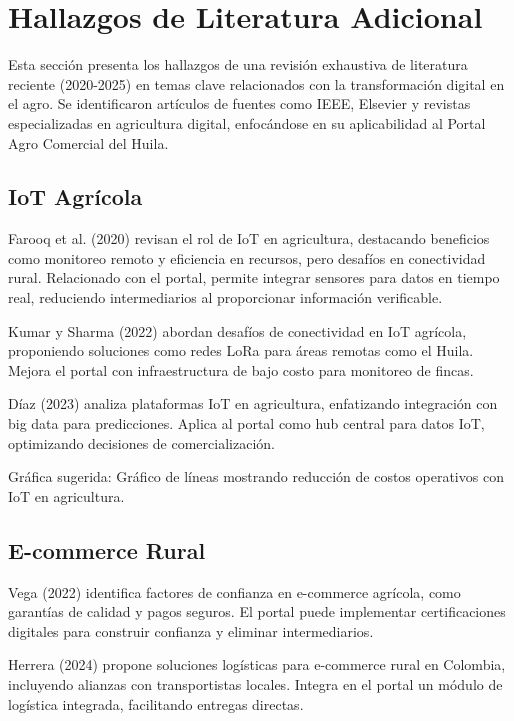 \section{Hallazgos de Literatura Adicional}

Esta sección presenta los hallazgos de una revisión exhaustiva de literatura reciente (2020-2025) en temas clave relacionados con la transformación digital en el agro. Se identificaron artículos de fuentes como IEEE, Elsevier y revistas especializadas en agricultura digital, enfocándose en su aplicabilidad al Portal Agro Comercial del Huila.

\subsection{IoT Agrícola}

Farooq et al. (2020) revisan el rol de IoT en agricultura, destacando beneficios como monitoreo remoto y eficiencia en recursos, pero desafíos en conectividad rural. Relacionado con el portal, permite integrar sensores para datos en tiempo real, reduciendo intermediarios al proporcionar información verificable.

Kumar y Sharma (2022) abordan desafíos de conectividad en IoT agrícola, proponiendo soluciones como redes LoRa para áreas remotas como el Huila. Mejora el portal con infraestructura de bajo costo para monitoreo de fincas.

Díaz (2023) analiza plataformas IoT en agricultura, enfatizando integración con big data para predicciones. Aplica al portal como hub central para datos IoT, optimizando decisiones de comercialización.

Gráfica sugerida: Gráfico de líneas mostrando reducción de costos operativos con IoT en agricultura.

\subsection{E-commerce Rural}

Vega (2022) identifica factores de confianza en e-commerce agrícola, como garantías de calidad y pagos seguros. El portal puede implementar certificaciones digitales para construir confianza y eliminar intermediarios.

Herrera (2024) propone soluciones logísticas para e-commerce rural en Colombia, incluyendo alianzas con transportistas locales. Integra en el portal un módulo de logística integrada, facilitando entregas directas.

